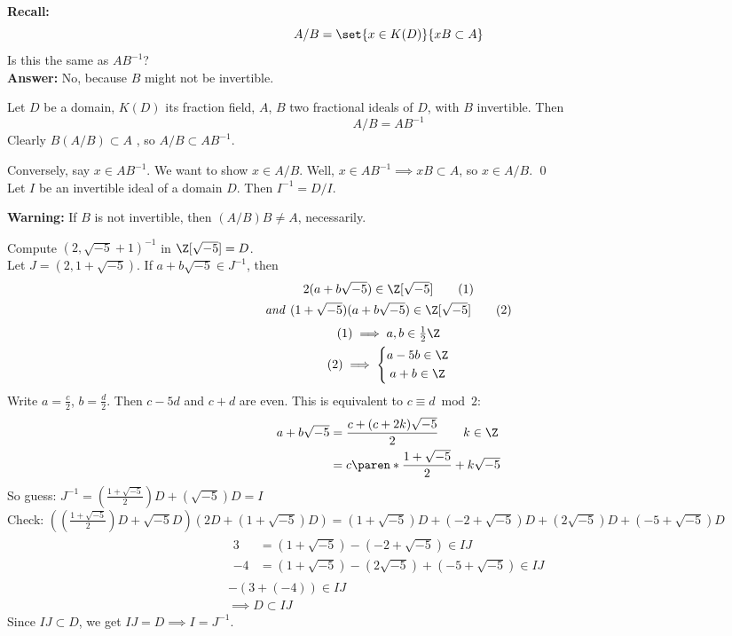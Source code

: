 \textbf{Recall:}
\[A/B=\set{x\in K(D)}{xB\subset A}\]
Is this the same as $AB^{-1}$? \\
\textbf{Answer:} No, because $B$ might not be invertible.

\thm Let $D$ be a domain, $K(D)$ its fraction field, $A$, $B$ two fractional ideals of $D$, with $B$ invertible.  Then
\[ A/B = AB^{-1} \]
\pf Clearly $B(A/B)\subset A$%
, so $A/B\subset AB^{-1}$.

Conversely, say $x\in AB^{-1}$.  We want to show $x\in A/B$.  Well, $x\in AB^{-1}\implies xB\subset A$, so $x\in A/B$. \qed \\
\cor Let $I$ be an invertible ideal of a domain $D$.  Then $I^{-1}=D/I$.

\textbf{Warning:} If $B$ is not invertible, then $(A/B)B\neq A$, necessarily.

\eg Compute $(2,\sqrt{-5}+1)^{-1}$ in $\Z[\sqrt{-5}]=D$. \\
\soln Let $J=(2,1+\sqrt{-5})$.  If $a+b\sqrt{-5}\in J^{-1}$, then
\begin{gather}
2(a+b\sqrt{-5}) \in \Z[\sqrt{-5}] \tag{1} \\
\text{\emph{and }} (1+\sqrt{-5})(a+b\sqrt{-5}) \in \Z[\sqrt{-5}] \tag{2}
\end{gather}
\begin{gather*}
(1) \implies a,b\in\tfrac12\Z \\
(2) \implies \left\{\begin{gathered}
a-5b\in\Z \\
a+b\in\Z
\end{gathered}\right.
\end{gather*}
Write $a=\frac{c}{2}$, $b=\frac{d}{2}$.  Then $c-5d$ and $c+d$ are even.  This is equivalent to $c\equiv d\bmod2$:
\begin{align*}
a+b\sqrt{-5} &= \frac{c+(c+2k)\sqrt{-5}}{2} \qquad k\in\Z \\
&= c\paren*{\frac{1+\sqrt{-5}}{2}} + k\sqrt{-5}
\end{align*}
So guess: $J^{-1}=(\frac{1+\sqrt{-5}}{2})D+(\sqrt{-5})D=I$ \\
Check: $((\frac{1+\sqrt{-5}}{2})D+\sqrt{-5}D)(2D+(1+\sqrt{-5})D)=(1+\sqrt{-5})D+(-2+\sqrt{-5})D+(2\sqrt{-5})D+(-5+\sqrt{-5})D$
\begin{gather*}
\begin{aligned}
3 &= (1+\sqrt{-5})-(-2+\sqrt{-5}) \in IJ \\
-4 &= (1+\sqrt{-5})-(2\sqrt{-5})+(-5+\sqrt{-5}) \in IJ %
\end{aligned} \\
-(3+(-4)) \in IJ \\
\implies D \subset IJ
\end{gather*}
Since $IJ\subset D$, we get $IJ=D\implies I=J^{-1}$.

